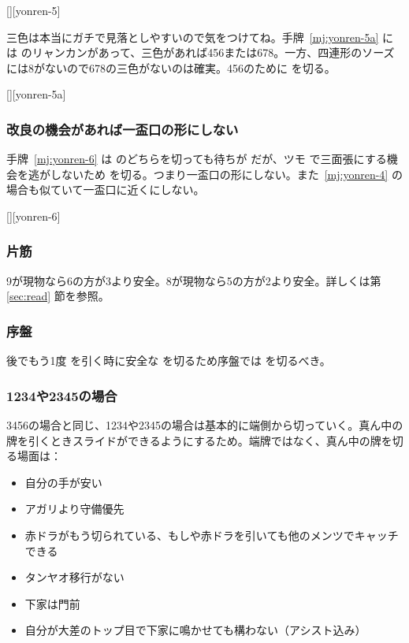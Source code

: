 \documentclass[../nankiru_main.tex]{subfiles}
\begin{document}
[][yonren-5]

三色は本当にガチで見落としやすいので気をつけてね。手牌~\ref{mj:yonren-5a} には  のリャンカンがあって、三色があれば456または678。一方、四連形のソーズには8がないので678の三色がないのは確実。456のために  を切る。

[][yonren-5a]


\subsubsection*{改良の機会があれば一盃口の形にしない}

手牌~\ref{mj:yonren-6} は  のどちらを切っても待ちが  だが、ツモ  で三面張にする機会を逃がしないため  を切る。つまり一盃口の形にしない。また~\ref{mj:yonren-4} の場合も似ていて一盃口に近くにしない。

[][yonren-6]


\subsubsection*{片筋}

9が現物なら6の方が3より安全。8が現物なら5の方が2より安全。詳しくは第 \ref{sec:read} 節を参照。


\subsubsection*{序盤}

後でもう1度  を引く時に安全な  を切るため序盤では  を切るべき。


\subsubsection*{1234や2345の場合}

3456の場合と同じ、1234や2345の場合は基本的に端側から切っていく。真ん中の牌を引くときスライドができるようにするため。端牌ではなく、真ん中の牌を切る場面は\citep[][pp.~171--172]{kawamura-naki}：

\begin{itemize}
\item 自分の手が安い
\item アガリより守備優先
\item 赤ドラがもう切られている、もしや赤ドラを引いても他のメンツでキャッチできる
\item タンヤオ移行がない
\item 下家は門前
\item 自分が大差のトップ目で下家に鳴かせても構わない（アシスト込み）
\end{itemize}
\end{document}
